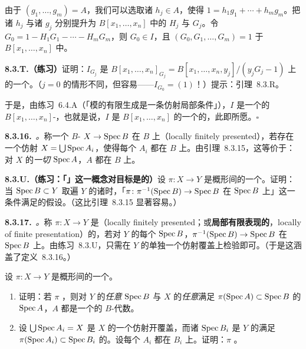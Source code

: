 由于 $(g_1,\dots,g_m)=A$，我们可以选取诸 $h_j\in A$，使得 $1=h_1g_1+\cdots+h_mg_m$。把诸 $h_j$ 与诸 $g_j$ 分别提升为 $B[x_1,\dots,x_n]$ 中的 $H_j$ 与 $G_j$。令 $G_0=1-H_1G_1-\cdots-H_mG_m$，则 $G_0\in I$，且 $(G_0,G_1,\dots,G_m)=1$ 于 $B[x_1,\dots,x_n]$ 中。

\textbf{8.3.T.（练习）}\quad 证明：$I_{G_j}$ 是 $B[x_1,\dots,x_n]_{G_j}=B[x_1,\dots,x_n,y_j]/(y_jG_j-1)$ 上的一个\trFinitelyGenerated{}\trModule。（$j=0$ 的情形不同，但容易——$I_{G_0}=(1)$！）提示：引理~8.3.R。

于是，由练习~6.4.A（「模的有限生成是一条仿射局部条件」），$I$ 是一个\trFinitelyGenerated{}的 $B[x_1,\dots,x_n]$-\trModule，也就是说，$I$ 是 $B[x_1,\dots,x_n]$ 的一个\trFinitelyGenerated{}的\trIdeal，此即所愿。\hfill$\square$

\textbf{8.3.16.}\ \emph{\trhDefinition{}。}\quad 称一个 $B$-\trScheme{} $X\to\operatorname{Spec} B$ 在 $B$ 上\textbf{\trLocally\trFinitelyPresented}（locally finitely presented），若存在一个仿射\trCover{} $X=\bigcup\operatorname{Spec} A_i$，使得每个 $A_i$ 都在 $B$ 上\trFinitelyPresented。由引理~8.3.15，这等价于：对 $X$ 的\emph{一切}\trAffine\trOpenSubset{} $\operatorname{Spec} A$，$A$ 都在 $B$ 上\trFinitelyPresented。

\textbf{8.3.U.（练习：「\trLocally\trFinitelyPresented{}\trMorphism」这一概念对目标是\trAffineLocal{}的）}\quad 设 $\pi\colon X\to Y$ 是概形间的一个\trMorphism。证明：当 $\operatorname{Spec} B\subset Y$ 取遍 $Y$ 的诸\trAffine\trOpenSubset{}时，「$\pi\colon\pi^{-1}(\operatorname{Spec} B)\to\operatorname{Spec} B$ 在 $\operatorname{Spec} B$ 上\trLocally\trFinitelyPresented」这一条件满足\trAffineCommunicationLemma{}的假设。（这比引理~8.3.15 显著容易。）

\textbf{8.3.17.}\ \emph{\trhDefinition{}。}\quad 称\trMorphism{} $\pi\colon X\to Y$ 是\textbf{\trLocally\trFinitelyPresented}（locally finitely presented；或\textbf{局部有限表现的}，locally of finite presentation）的，若对 $Y$ 的每个\trAffine\trOpenSet{} $\operatorname{Spec} B$，$\pi^{-1}(\operatorname{Spec} B)\to\operatorname{Spec} B$ 在 $\operatorname{Spec} B$ 上\trLocally\trFinitelyPresented。由练习~8.3.U，只需在 $Y$ 的单独一个仿射覆盖上检验即可。（于是这涵盖了定义~8.3.16。）

\begin{exercise}\label{ex:locally-finitely-presented-covers}
设 $\pi\colon X\to Y$ 是概形间的一个\trMorphism。
\begin{enumerate}[label=(\alph*)]
\item 证明：若 $\pi$ \trLocally\trFinitelyPresented，则对 $Y$ 的\emph{任意}\trOpenSubscheme{} $\operatorname{Spec} B$ 与 $X$ 的\emph{任意}满足 $\pi(\operatorname{Spec} A)\subset\operatorname{Spec} B$ 的\trAffine\trOpenSubscheme{} $\operatorname{Spec} A$，$A$ 都是一个\trFinitelyPresented{}的 $B$-代数。
\item 设 $\bigcup\operatorname{Spec} A_i=X$ 是 $X$ 的一个仿射开覆盖，而诸 $\operatorname{Spec} B_i$ 是 $Y$ 的满足 $\pi(\operatorname{Spec} A_i)\subset\operatorname{Spec} B_i$ 的\trAffine\trOpenSubset。设每个 $A_i$ 都在 $B_i$ 上\trFinitelyPresented。证明：$\pi$ \trLocally\trFinitelyPresented。
\end{enumerate}
\end{exercise}

